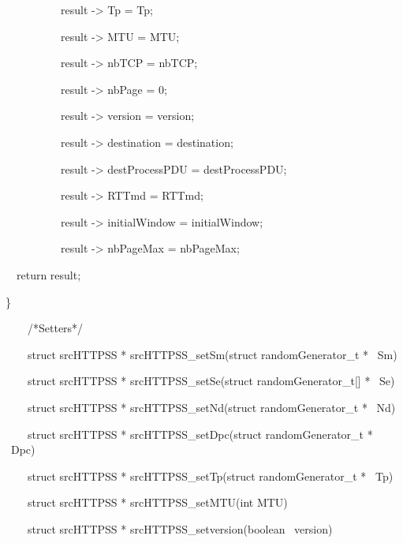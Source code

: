 \documentclass[a4paper]{article}
\begin{document}
{
\ \ \ \ \ \ \ \ \ \ result -{\textgreater} Tp = Tp;}

{
\ \ \ \ \ \ \ \ \ \ result -{\textgreater} MTU = MTU;}

{
\ \ \ \ \ \ \ \ \ \ result -{\textgreater} nbTCP = nbTCP; }

{
\ \ \ \ \ \ \ \ \ \ result -{\textgreater} nbPage = 0;}

{
\ \ \ \ \ \ \ \ \ \ result -{\textgreater} version = version;}

{
\ \ \ \ \ \ \ \ \ \ result -{\textgreater} destination = destination;}

{
\ \ \ \ \ \ \ \ \ \ result -{\textgreater} destProcessPDU = destProcessPDU;}

{
\ \ \ \ \ \ \ \ \ \ result -{\textgreater} RTTmd = RTTmd;}

{
\ \ \ \ \ \ \ \ \ \ result -{\textgreater} initialWindow = initialWindow;}

{
\ \ \ \ \ \ \ \ \ \ result -{\textgreater} nbPageMax = nbPageMax;}


\bigskip


{
\ \ return result;}

{
\}}

{
\ \ \ \ /*Setters*/}

{
\ \ \ \ struct srcHTTPSS * srcHTTPSS\_setSm(struct randomGenerator\_t *
\ Sm)}

{
\ \ \ \ struct srcHTTPSS * srcHTTPSS\_setSe(struct randomGenerator\_t[]
* \ Se)}

{
\ \ \ \ struct srcHTTPSS * srcHTTPSS\_setNd(struct randomGenerator\_t *
\ Nd)}

{
\ \ \ \ struct srcHTTPSS * srcHTTPSS\_setDpc(struct randomGenerator\_t *
\ Dpc)}

{
\ \ \ \ struct srcHTTPSS * srcHTTPSS\_setTp(struct randomGenerator\_t *
\ Tp)}

{
\ \ \ \ struct srcHTTPSS * srcHTTPSS\_setMTU(int MTU)}

{
\ \ \ \ struct srcHTTPSS * srcHTTPSS\_setversion(boolean \ version)}


\bigskip
\end{document}
